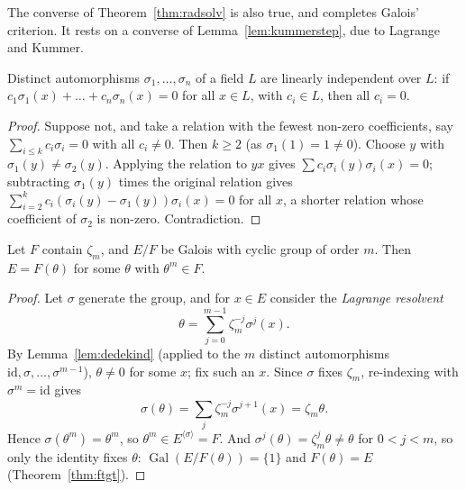 The converse of Theorem~\ref{thm:radsolv} is also true, and completes Galois' criterion. It rests on a converse of Lemma~\ref{lem:kummerstep}, due to Lagrange and Kummer.

\begin{lemma}[Dedekind]\label{lem:dedekind}
Distinct automorphisms $\sigma_1,\dots,\sigma_n$ of a field $L$ are linearly independent over $L$: if $c_1\sigma_1(x)+\dots+c_n\sigma_n(x)=0$ for all $x\in L$, with $c_i\in L$, then all $c_i=0$.
\end{lemma}
\begin{proof}
Suppose not, and take a relation with the fewest non-zero coefficients, say $\sum_{i\le k}c_i\sigma_i=0$ with all $c_i\ne0$. Then $k\ge2$ (as $\sigma_1(1)=1\ne0$). Choose $y$ with $\sigma_1(y)\ne\sigma_2(y)$. Applying the relation to $yx$ gives $\sum c_i\sigma_i(y)\sigma_i(x)=0$; subtracting $\sigma_1(y)$ times the original relation gives $\sum_{i=2}^kc_i(\sigma_i(y)-\sigma_1(y))\sigma_i(x)=0$ for all $x$, a shorter relation whose coefficient of $\sigma_2$ is non-zero. Contradiction.
\end{proof}

\begin{proposition}[Kummer]\label{prop:kummer}
Let $F$ contain $\zeta_m$, and $E/F$ be Galois with cyclic group of order $m$. Then $E=F(\theta)$ for some $\theta$ with $\theta^m\in F$.
\end{proposition}
\begin{proof}
Let $\sigma$ generate the group, and for $x\in E$ consider the \emph{Lagrange resolvent}
\[
\theta=\sum_{j=0}^{m-1}\zeta_m^{-j}\sigma^j(x).
\]
By Lemma~\ref{lem:dedekind} (applied to the $m$ distinct automorphisms $\mathrm{id},\sigma,\dots,\sigma^{m-1}$), $\theta\ne0$ for some $x$; fix such an $x$. Since $\sigma$ fixes $\zeta_m$, re-indexing with $\sigma^m=\mathrm{id}$ gives
\[
\sigma(\theta)=\sum_j\zeta_m^{-j}\sigma^{j+1}(x)=\zeta_m\theta.
\] Hence $\sigma(\theta^m)=\theta^m$, so $\theta^m\in E^{\langle\sigma\rangle}=F$. And $\sigma^j(\theta)=\zeta_m^j\theta\ne\theta$ for $0<j<m$, so only the identity fixes $\theta$: $\operatorname{Gal}(E/F(\theta))=\{1\}$ and $F(\theta)=E$ (Theorem~\ref{thm:ftgt}).
\end{proof}

